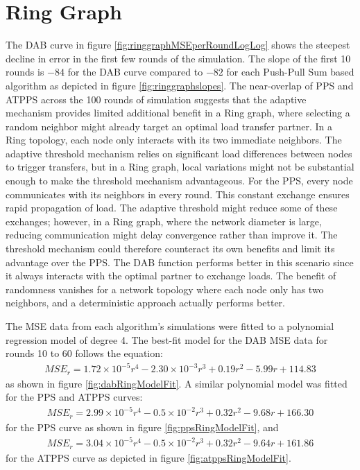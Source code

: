 \section{Ring Graph}\label{sec:ringgraph}
The DAB curve in figure \ref{fig:ringgraphMSEperRoundLogLog} shows the steepest decline in error in the first few rounds of the simulation. The slope of the first 10 rounds is $-84$ for the DAB curve compared to $-82$ for each Push-Pull Sum based algorithm as depicted in figure \ref{fig:ringgraphslopes}. The near-overlap of PPS and ATPPS across the 100 rounds of simulation suggests that the adaptive mechanism provides limited additional benefit in a Ring graph, where selecting a random neighbor might already target an optimal load transfer partner. In a Ring topology, each node only interacts with its two immediate neighbors. The adaptive threshold mechanism relies on significant load differences between nodes to trigger transfers, but in a Ring graph, local variations might not be substantial enough to make the threshold mechanism advantageous. For the PPS, every node communicates with its neighbors in every round. This constant exchange ensures rapid propagation of load. The adaptive threshold might reduce some of these exchanges; however, in a Ring graph, where the network diameter is large, reducing communication might delay convergence rather than improve it. The threshold mechanism could therefore counteract its own benefits and limit its advantage over the PPS. The DAB function performs better in this scenario since it always interacts with the optimal partner to exchange loads. The benefit of randomness vanishes for a network topology where each node only has two neighbors, and a deterministic approach actually performs better.

The MSE data from each algorithm's simulations were fitted to a polynomial regression model of degree 4. The best-fit model for the DAB MSE data for rounds 10 to 60 follows the equation:
\begin{align}
    MSE_r=1.72\times 10^{-5}r^{4}-2.30\times 10^{-3}r^{3}+ 0.19r^{2}-5.99r+114.83    
\end{align}
as shown in figure \ref{fig:dabRingModelFit}. A similar polynomial model was fitted for the PPS and ATPPS curves:
\begin{align}
    MSE_r= 2.99\times 10^{-5}r^{4}-0.5\times 10^{-2}r^{3} + 0.32r^{2} -9.68r + 166.30    
\end{align}
for the PPS curve as shown in figure \ref{fig:ppsRingModelFit}, and 
\begin{align}
    MSE_r=3.04\times 10^{-5}r^{4}-0.5\times 10^{-2}r^{3} + 0.32r^{2}-9.64r+161.86    
\end{align}
for the ATPPS curve as depicted in figure \ref{fig:atppsRingModelFit}.

